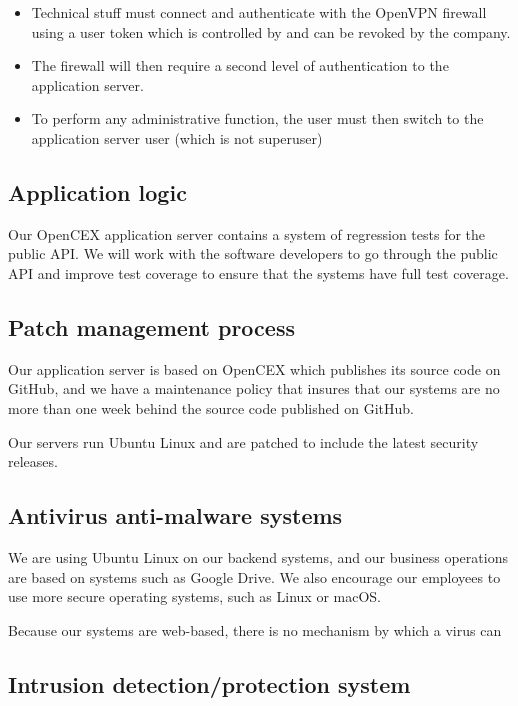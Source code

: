 \begin{itemize}
\item Technical stuff must connect and authenticate with the OpenVPN
firewall using a user token which is controlled by and can be revoked
by the company.
\item The firewall will then require a second level of authentication to
the application server.
\item To perform any administrative function, the user must then switch
  to the application server user (which is not superuser)
\end{itemize}


\subsection{Application logic}
Our OpenCEX application server contains a system of regression tests for the
public API.  We will work with the software developers to go through
the public API and improve test coverage to ensure that the systems
have full test coverage.

\subsection{Patch management process}

Our application server is based on OpenCEX which publishes its
source code on GitHub, and we have a maintenance policy that insures
that our systems are no more than one week behind the source code
published on GitHub.

Our servers run Ubuntu Linux and are patched to include the latest
security releases.

\subsection{Antivirus anti-malware systems}

We are using Ubuntu Linux on our backend systems, and our business
operations are based on systems such as Google Drive.  We also
encourage our employees to use more secure operating systems, such as
Linux or macOS.

Because our systems are web-based, there is no mechanism by which a
virus can 

\subsection{Intrusion detection/protection system}

